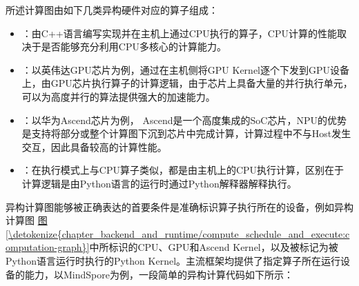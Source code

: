 \documentclass[letterpaper,10pt,english]{sphinxmanual}
\begin{document}
\sphinxAtStartPar
所述计算图由如下几类异构硬件对应的算子组成：
\begin{itemize}
\item {} 
\sphinxAtStartPar
{}：由C++语言编写实现并在主机上通过CPU执行的算子，CPU计算的性能取决于是否能够充分利用CPU多核心的计算能力。

\item {} 
\sphinxAtStartPar
{}：以英伟达GPU芯片为例，通过在主机侧将GPU
Kernel逐个下发到GPU设备上，由GPU芯片执行算子的计算逻辑，由于芯片上具备大量的并行执行单元，可以为高度并行的算法提供强大的加速能力。

\item {} 
\sphinxAtStartPar
{}：以华为Ascend芯片为例，
Ascend是一个高度集成的SoC芯片，NPU的优势是支持将部分或整个计算图下沉到芯片中完成计算，计算过程中不与Host发生交互，因此具备较高的计算性能。

\item {} 
\sphinxAtStartPar
{}：在执行模式上与CPU算子类似，都是由主机上的CPU执行计算，区别在于计算逻辑是由Python语言的运行时通过Python解释器解释执行。

\end{itemize}

\sphinxAtStartPar
异构计算图能够被正确表达的首要条件是准确标识算子执行所在的设备，例如异构计算图
\hyperref[\detokenize{chapter_backend_and_runtime/compute_schedule_and_execute:computation-graph}]{图\ref{\detokenize{chapter_backend_and_runtime/compute_schedule_and_execute:computation-graph}}}中所标识的CPU、GPU和Ascend
Kernel，以及被标记为被Python语言运行时执行的Python
Kernel。主流框架均提供了指定算子所在运行设备的能力，以MindSpore为例，一段简单的异构计算代码如下所示：
\end{document}
